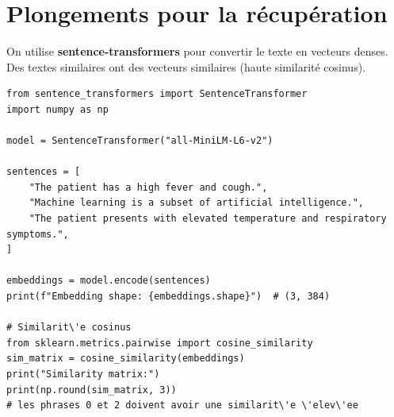 \begin{center}
\end{center}

\section{Plongements pour la r\'ecup\'eration}

On utilise \textbf{sentence-transformers} pour convertir le texte en vecteurs denses. Des textes similaires ont des vecteurs similaires (haute similarit\'e cosinus).

\begin{verbatim}
from sentence_transformers import SentenceTransformer
import numpy as np

model = SentenceTransformer("all-MiniLM-L6-v2")

sentences = [
    "The patient has a high fever and cough.",
    "Machine learning is a subset of artificial intelligence.",
    "The patient presents with elevated temperature and respiratory symptoms.",
]

embeddings = model.encode(sentences)
print(f"Embedding shape: {embeddings.shape}")  # (3, 384)

# Similarit\'e cosinus
from sklearn.metrics.pairwise import cosine_similarity
sim_matrix = cosine_similarity(embeddings)
print("Similarity matrix:")
print(np.round(sim_matrix, 3))
# les phrases 0 et 2 doivent avoir une similarit\'e \'elev\'ee
\end{verbatim}

